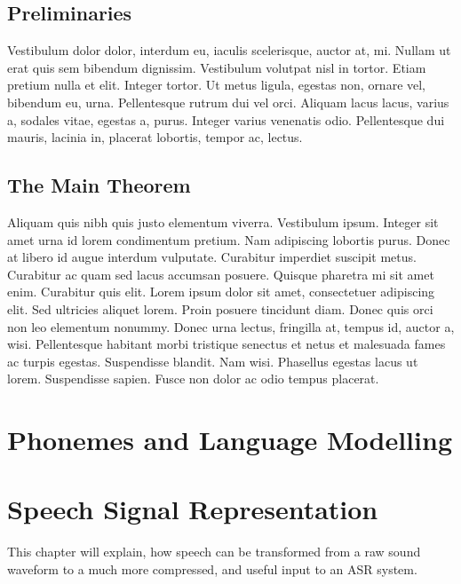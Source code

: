 \documentclass[a4paper,11pt]{kth-mag}
\begin{document}
\section{Preliminaries}
Vestibulum dolor dolor, interdum eu, iaculis scelerisque, auctor at,
mi. Nullam ut erat quis sem bibendum dignissim. Vestibulum volutpat
nisl in tortor. Etiam pretium nulla et elit. Integer tortor. Ut metus
ligula, egestas non, ornare vel, bibendum eu, urna. Pellentesque
rutrum dui vel orci. Aliquam lacus lacus, varius a, sodales vitae,
egestas a, purus. Integer varius venenatis odio. Pellentesque dui
mauris, lacinia in, placerat lobortis, tempor ac, lectus.

\section{The Main Theorem}
Aliquam quis nibh quis justo elementum viverra. Vestibulum ipsum.
Integer sit amet urna id lorem condimentum pretium. Nam adipiscing
lobortis purus. Donec at libero id augue interdum vulputate. Curabitur
imperdiet suscipit metus. Curabitur ac quam sed lacus accumsan
posuere. Quisque pharetra mi sit amet enim. Curabitur quis elit. Lorem
ipsum dolor sit amet, consectetuer adipiscing elit. Sed ultricies
aliquet lorem. Proin posuere tincidunt diam. Donec quis orci non leo
elementum nonummy. Donec urna lectus, fringilla at, tempus id, auctor
a, wisi. Pellentesque habitant morbi tristique senectus et netus et
malesuada fames ac turpis egestas. Suspendisse blandit. Nam wisi.
Phasellus egestas lacus ut lorem. Suspendisse sapien. Fusce non dolor
ac odio tempus placerat.\chapter{Phonemes and Language Modelling}
\chapter{Speech Signal Representation}
This chapter will explain, how speech can be transformed from a raw sound
waveform to a much more compressed, and useful input to an ASR system.
\end{document}
